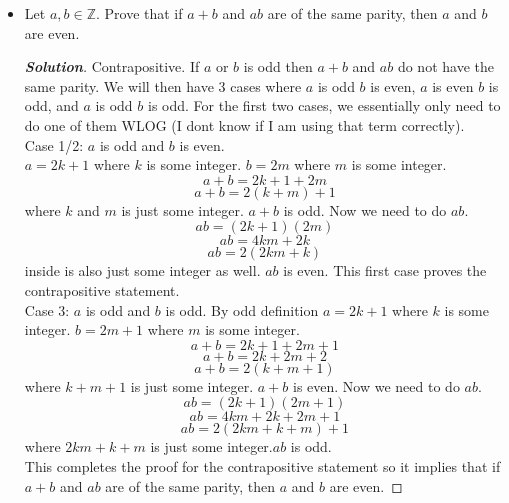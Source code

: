 \documentclass[11pt]{article}
\newenvironment{problem}[2][Problem\!]{\begin{trivlist}
\item[\hskip \labelsep {\bfseries #1}\hskip \labelsep {\bfseries #2.}]}{\end{trivlist}}
\newenvironment{solution}{\begin{proof}[\textbf{\textit{Solution}}]}{\end{proof}}
\newcommand{\zz}{\mathbb Z}   %
\begin{document}
\begin{problem}{4.1}
\begin{itemize}[itemsep=3em]
\item[(b)] Let $a, b \in \zz$. Prove that if $a + b$ and $ab$ are of the same parity, then $a$ and $b$ are even.
\begin{solution}
Contrapositive. If \(a\) or \(b\) is odd then \(a+b\) and \(ab\) do not have the same parity. We will then have 3 cases where \(a\) is odd \(b\) is even, \(a\) is even \(b\) is odd, and \(a\) is odd \(b\) is odd. For the first two cases, we essentially only need to do one of them WLOG (I dont know if I am using that term correctly).\\
Case 1/2: \(a\) is odd and \(b\) is even.\\
\(a = 2k + 1\) where \(k\) is some integer. \(b = 2m\) where \(m\) is some integer. 
\[a+b = 2k+1+2m\]
\[a+b = 2(k+m)+1\] where \(k\) and \(m\) is just some integer. \(a+b\) is odd.
Now we need to do \(ab\).
\[ab = (2k+1)(2m)\]
\[ab = 4km+2k\]
\[ab = 2(2km+k)\] inside is also just some integer as well. \(ab\) is even. This first case proves the contrapositive statement.\\
Case 3: \(a\) is odd and \(b\) is odd.
By odd definition \(a = 2k + 1\) where \(k\) is some integer. \(b = 2m+1\) where \(m\) is some integer. 
\[a+b = 2k+1+2m+1\]
\[a+b = 2k+2m+2\]
\[a+b = 2(k+m+1)\] where \(k+m+1\) is just some integer. \(a+b\) is even.
Now we need to do \(ab\).
\[ab = (2k+1)(2m+1)\]
\[ab = 4km+2k+2m+1\]
\[ab = 2(2km+k+m)+1\] where \(2km+k+m\) is just some integer.\(ab\) is odd.\\
This completes the proof for the contrapositive statement so it implies that if \(a+b\) and \(ab\) are of the same parity, then \(a\) and \(b\) are even.
\end{solution}

\end{itemize}
\end{problem}

\newpage %
\end{document}
